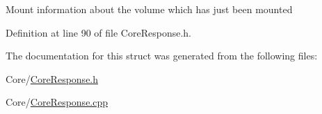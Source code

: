 Mount information about the volume which has just been mounted 

Definition at line 90 of file Core\+Response.\+h.



The documentation for this struct was generated from the following files\+:\begin{DoxyCompactItemize}
\item 
Core/\hyperlink{_core_response_8h}{Core\+Response.\+h}\item 
Core/\hyperlink{_core_response_8cpp}{Core\+Response.\+cpp}\end{DoxyCompactItemize}
